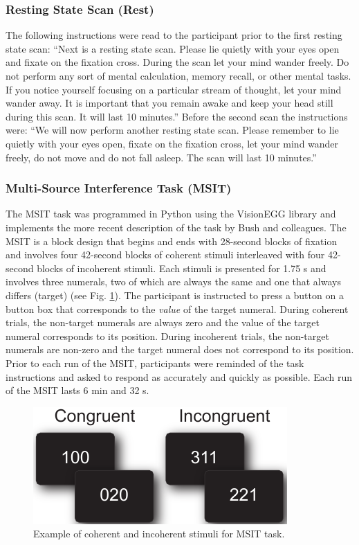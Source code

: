 \documentclass[english,11pt]{article}
\begin{document}
\subsubsection*{Resting State Scan (Rest)}

The following instructions were read to the participant prior to the first resting state scan: ``Next is a resting state scan.  Please lie quietly with your eyes open and fixate on the fixation cross.  During the scan let your mind wander freely.  Do not perform any sort of mental calculation, memory recall, or other mental tasks.  If you notice yourself focusing on a particular stream of thought, let your mind wander away.  It is important that you remain awake and keep your head still during this scan.  It will last 10 minutes.'' Before the second scan the instructions were: ``We will now perform another resting state scan.  Please remember to lie quietly with your eyes open, fixate on the fixation cross, let your mind wander freely, do not move and do not fall asleep.  The scan will last 10 minutes.''

\subsubsection*{Multi-Source Interference Task (MSIT)}

The MSIT task was programmed in Python using the VisionEGG library\cite{needed} and implements the more recent description of the task by Bush and colleagues\cite{needed}. The MSIT is a block design that begins and ends with 28-second blocks of fixation and involves four 42-second blocks of coherent stimuli interleaved with four 42-second blocks of incoherent stimuli. Each stimuli is presented for 1.75 \si{\second} and involves three numerals, two of which are always the same and one that always differs (target) (see Fig. \ref{fig:msit_stim}). The participant is instructed to press a button on a button box that corresponds to the \emph{value} of the target numeral. During coherent trials, the non-target numerals are always zero and the value of the target numeral corresponds to its position. During incoherent trials, the non-target numerals are non-zero and the target numeral does not correspond to its position. Prior to each run of the MSIT, participants were reminded of the task instructions and asked to respond as accurately and quickly as possible. Each run of the MSIT lasts 6 \si{\minute} and 32 \si{\second}.

\begin{figure}[!ht]
    \centering
    \includegraphics[]{msit_stim2}
    \caption{Example of coherent and incoherent stimuli for MSIT task.}
    \label{fig:msit_stim}
\end{figure}
\end{document}
